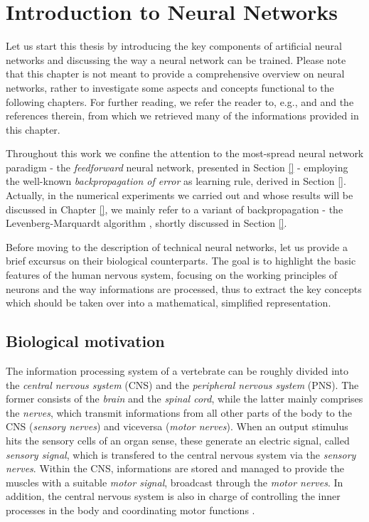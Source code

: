 \documentclass[11pt, a4paper, twoside, openright]{report}
\theoremstyle{theorem}
\numberwithin{equation}{section}
\numberwithin{figure}{section}
\begin{document}
	\chapter{Introduction to Neural Networks}
	\label{chapter:Introduction to Neural Networks}
	
		Let us start this thesis by introducing the key components of artificial neural networks and discussing the way a neural network can be trained. Please note that this chapter is not meant to provide a comprehensive overview on neural networks, rather to investigate some aspects and concepts functional to the following chapters. For further reading, we refer the reader to, e.g., \cite{Hag14} and \cite{Kri} and the references therein, from which we retrieved many of the informations provided in this chapter.
		
		Throughout this work we confine the attention to the most-spread neural network paradigm - the \emph{feedforward} neural network, presented in Section \ref{} - employing the well-known \emph{backpropagation of error} as learning rule, derived in Section \ref{}. Actually, in the numerical experiments we carried out and whose results will be discussed in Chapter \ref{}, we mainly refer to a variant of backpropagation - the Levenberg-Marquardt algorithm \cite{}, shortly discussed in Section \ref{}. 
		
		Before moving to the description of technical neural networks, let us provide a brief excursus on their biological counterparts. The goal is to highlight the basic features of the human nervous system, focusing on the working principles of neurons and the way informations are processed, thus to extract the key concepts which should be taken over into a mathematical, simplified representation. 
		
	\section{Biological motivation}
	\label{section:Biological motivation} 
		
		The information processing system of a vertebrate can be roughly divided into the \emph{central nervous system} (CNS) and the \emph{peripheral nervous system} (PNS). The former consists of the \emph{brain} and the \emph{spinal cord}, while the latter mainly comprises the \emph{nerves}, which transmit informations from all other parts of the body to the CNS (\emph{sensory nerves}) and viceversa (\emph{motor nerves}). When an output stimulus hits the sensory cells of an organ sense, these generate an electric signal, called \emph{sensory signal}, which is transfered to the central nervous system via the \emph{sensory nerves}. Within the CNS, informations are stored and managed to provide the muscles with a suitable \emph{motor signal}, broadcast through the \emph{motor nerves}. In addition, the central nervous system is also in charge of controlling the inner processes in the body and coordinating motor functions \cite{Kri}.
		
\end{document}
